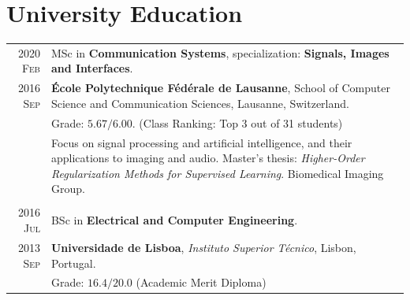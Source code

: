 \documentclass[a4paper,10pt]{article}
\begin{document}

    \vspace{15pt}

    \section{University Education}

      \begin{tabular}{r|p{13cm}}

        \textsc{2020 Feb}  &
        MSc in \textbf{Communication Systems}, specialization: \textbf{Signals, Images and Interfaces}. \\
        \textsc{2016 Sep} & \footnotesize{\textbf{École Polytechnique Fédérale de Lausanne}, School of Computer Science and Communication Sciences, Lausanne, Switzerland.} \\
        & \footnotesize{
        Grade: $\bm{5.67/6.00}$.} (Class Ranking: Top 3 out of 31 students) \\
        & \footnotesize{Focus on signal processing and artificial intelligence, and their applications to imaging and audio. Master's thesis: \emph{Higher-Order Regularization Methods for Supervised Learning}. Biomedical Imaging Group.} \\
        \multicolumn{2}{c}{} \\

        \textsc{\phantom{5}2016 Jul} &
        BSc in \textbf{Electrical and Computer Engineering}. \\
        \textsc{2013 Sep} &  \footnotesize{\textbf{Universidade de Lisboa}, \emph{Instituto Superior Técnico}, Lisbon, Portugal.} \\
        & \footnotesize{Grade: $\bm{16.4/20.0}$} (Academic Merit Diploma)
      \end{tabular}
\end{document}
